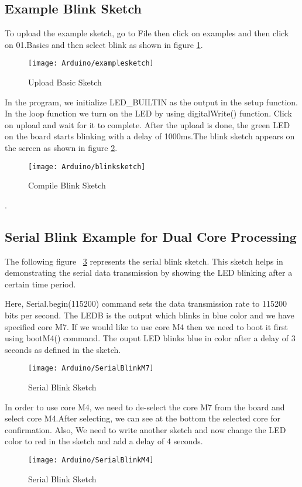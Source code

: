 \subsection{Example Blink Sketch}
To upload the example sketch, go to File then click on examples and then click on 01.Basics and then select blink as shown in figure \ref{figure 5.3}.
\begin{figure}[H]
	\centering
	\texttt{[image: Arduino/examplesketch]}
	\caption{Upload Basic Sketch}
	\label{figure 5.3}
\end{figure}

In the program, we initialize LED\_BUILTIN as the output in the setup function. In the loop function   we turn on the LED by using digitalWrite() function. Click on upload and wait for it to complete. After the upload is done, the green LED on the board starts blinking with a delay of 1000ms.The blink sketch appears on the screen as shown in figure \ref{figure 5.4}.


\begin{figure}[H]
	\centering
	\texttt{[image: Arduino/blinksketch]}
	\caption{Compile Blink Sketch}
	\label{figure 5.4}
\end{figure}
.
\subsection{Serial Blink Example for Dual Core Processing}

The following figure~ \ref{figure 5.5} represents the serial blink sketch. This sketch helps in demonstrating the serial data transmission by showing the LED blinking after a certain time period. 

Here, Serial.begin(115200) command sets the data transmission rate to 115200 bits per second. The LEDB is the output which blinks in blue color and we have specified core M7. If we would like to use core M4 then we need to boot it first using bootM4() command. The ouput LED blinks blue in color after a delay of 3 seconds as defined in the sketch.
\begin{figure}[H]
	\centering
	\texttt{[image: Arduino/SerialBlinkM7]}
	\caption{Serial Blink Sketch}
	\label{figure 5.5}
\end{figure}

In order to use core M4, we need to de-select the core M7 from the board and select core M4.After selecting, we can see at the bottom the selected core for confirmation. Also, We need to write another sketch and  now change the LED color to red in the sketch and add a delay of 4 seconds. 
\begin{figure}[H]
	\centering
	\texttt{[image: Arduino/SerialBlinkM4]}
	\caption{Serial Blink Sketch}
	\label{figure 5.6}
\end{figure}

